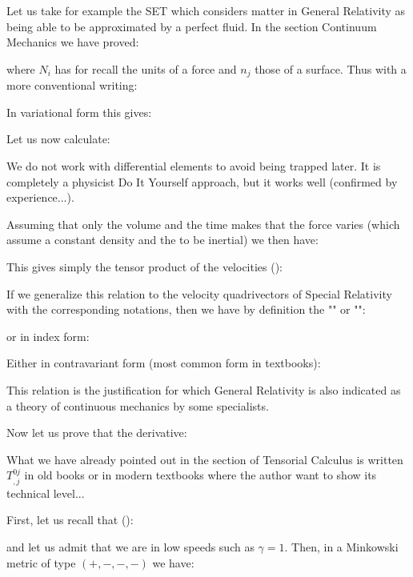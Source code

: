 	Let us take for example the SET which considers matter in General Relativity as being able to be approximated by a perfect fluid. In the section Continuum Mechanics we have proved:
	
	where $N_i$ has for recall the units of a force and $n_j$ those of a surface. Thus with a more conventional writing:
	
	In variational form this gives:
	
	Let us now calculate:
	
	\begin{tcolorbox}[title=Remark,colframe=black,arc=10pt]
	We do not work with differential elements to avoid being trapped later. It is completely a physicist Do It Yourself approach, but it works well (confirmed by experience...).
	\end{tcolorbox}
	Assuming that only the volume and the time makes that the force varies (which assume a constant density and the to be inertial) we then have:
	
	This gives simply the tensor product of the velocities ():
	
	If we generalize this relation to the velocity quadrivectors of Special Relativity with the corresponding notations, then we have by definition the "" or "":
	
	or in index form:
	
	Either in contravariant form (most common form in textbooks):
	
	This relation is the justification for which General Relativity is also indicated as a theory of continuous mechanics by some specialists.

	Now let us prove that the derivative:
	
	\begin{tcolorbox}[title=Remark,colframe=black,arc=10pt]
	What we have already pointed out in the section of Tensorial Calculus is written $T^{0j}_{,j}$ in old books or in modern textbooks where the author want to show its technical level...
	\end{tcolorbox}	
	First, let us recall that ():
	
	and let us admit that we are in low speeds such as $\gamma=1$. Then, in a Minkowski metric of type $(+, -, -, -)$ we have:
	
